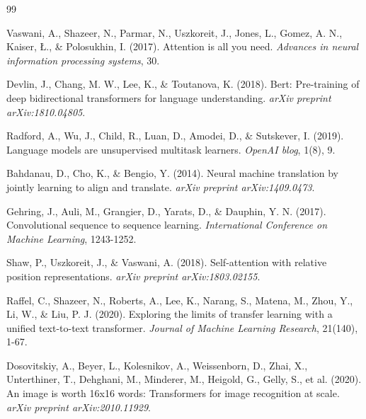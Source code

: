 \documentclass[UTF8,12pt,a4paper]{ctexart}
\begin{document}
\begin{thebibliography}{99}

Vaswani, A., Shazeer, N., Parmar, N., Uszkoreit, J., Jones, L., Gomez, A. N., Kaiser, Ł., \& Polosukhin, I. (2017). 
Attention is all you need. 
\textit{Advances in neural information processing systems}, 30.

Devlin, J., Chang, M. W., Lee, K., \& Toutanova, K. (2018). 
Bert: Pre-training of deep bidirectional transformers for language understanding. 
\textit{arXiv preprint arXiv:1810.04805}.

Radford, A., Wu, J., Child, R., Luan, D., Amodei, D., \& Sutskever, I. (2019). 
Language models are unsupervised multitask learners. 
\textit{OpenAI blog}, 1(8), 9.

Bahdanau, D., Cho, K., \& Bengio, Y. (2014). 
Neural machine translation by jointly learning to align and translate. 
\textit{arXiv preprint arXiv:1409.0473}.

Gehring, J., Auli, M., Grangier, D., Yarats, D., \& Dauphin, Y. N. (2017). 
Convolutional sequence to sequence learning. 
\textit{International Conference on Machine Learning}, 1243-1252.

Shaw, P., Uszkoreit, J., \& Vaswani, A. (2018). 
Self-attention with relative position representations. 
\textit{arXiv preprint arXiv:1803.02155}.

Raffel, C., Shazeer, N., Roberts, A., Lee, K., Narang, S., Matena, M., Zhou, Y., Li, W., \& Liu, P. J. (2020). 
Exploring the limits of transfer learning with a unified text-to-text transformer. 
\textit{Journal of Machine Learning Research}, 21(140), 1-67.

Dosovitskiy, A., Beyer, L., Kolesnikov, A., Weissenborn, D., Zhai, X., Unterthiner, T., Dehghani, M., Minderer, M., Heigold, G., Gelly, S., et al. (2020). 
An image is worth 16x16 words: Transformers for image recognition at scale. 
\textit{arXiv preprint arXiv:2010.11929}.

\end{thebibliography}
\end{document}
